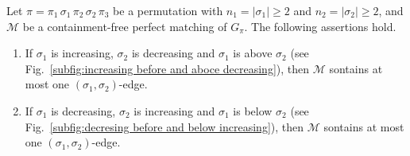 \documentclass[a4paper]{llncs}
\begin{document}
\begin{lemma}
  \label{lemma:at most one edge monotone}
  Let $\pi = \pi_1 \, \sigma_1 \, \pi_2 \, \sigma_2 \, \pi_3$
  be a permutation with $n_1 = |\sigma_1| \geq 2$ and $n_2 = |\sigma_2| \geq 2$,
  and $\mathcal{M}$ be a containment-free perfect matching of $G_\pi$.
  The following assertions hold.
  \begin{enumerate}
    \item
    If $\sigma_1$ is increasing, $\sigma_2$ is decreasing and
    $\sigma_1$ is above $\sigma_2$
    (see Fig.~\ref{subfig:increasing before and aboce decreasing}),
    then $\mathcal{M}$ sontains at most one $(\sigma_1, \sigma_2)$-edge.
    \item
    If $\sigma_1$ is decreasing, $\sigma_2$ is increasing and
    $\sigma_1$ is below $\sigma_2$
    (see Fig.~\ref{subfig:decresing before and below increasing}),
    then $\mathcal{M}$ sontains at most one $(\sigma_1, \sigma_2)$-edge.
  \end{enumerate}
\end{lemma}
\end{document}
